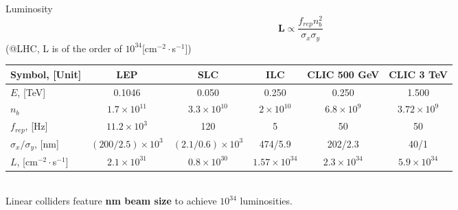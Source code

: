 \documentclass{beamer}
\begin{document}
\begin{frame}{Luminosity}
 \begin{equation*}
 \mathbf{L} \propto \frac{f_{rep}n_b^2}{\sigma_x\sigma_y}\label{eq:lum}%
\end{equation*}
{\tiny (@LHC, L is of the order of $10^{34}$[cm$^{-2}\cdot$s$^{-1}$])}
\hspace*{-0.7cm}
{\scriptsize
\begin{tabular}{l||c|c|c|c|c}\hline
Symbol, [Unit] & LEP & SLC & ILC & CLIC 500 GeV& CLIC 3 TeV\\\hline\hline
$E$, [TeV] &0.1046&0.050& 0.250 & 0.250 & 1.500\\
$n_b$ &$1.7\times10^{11}$&$3.3\times10^{10}$&$2\times10^{10}$&$6.8\times10^9$&$3.72\times10^9$\\
$f_{rep}$, [Hz] &$11.2\times10^3$&120&5&50&50\\
$\sigma_x/\sigma_y$, [nm]&$(200/2.5)\times10^3$&$(2.1/0.6)\times10^3$&474/5.9&202/2.3&40/1\\\hline
$L$, [cm$^{-2}\cdot$s$^{-1}$]&$2.1\times10^{31}$&$0.8\times10^{30}$&$1.57\times10^{34}$& $2.3\times10^{34}$&$5.9\times10^{34}$\\\hline
\end{tabular}
}
\\
Linear colliders feature \textbf{nm beam size} to achieve $10^{34}$ luminosities.
\end{frame}
\end{document}
